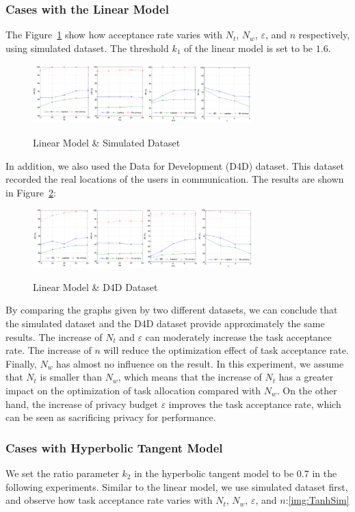 \subsubsection{Cases with the Linear Model}
The Figure~\ref{img:LinSim} show how acceptance rate varies with $N_t$, $N_w$, $\varepsilon$, and $n$ respectively, using simulated dataset. The threshold $k_1$ of the linear model is set to be $1.6$.

\begin{figure}
\includegraphics[width=8.5cm]{LinSim}
\label{img:LinSim}
\caption{Linear Model \& Simulated Dataset}
\end{figure}

In addition, we also used the Data for Development (D4D) dataset. This dataset recorded the real locations of the users in communication. The results are shown in Figure~\ref{img:LinD4D}:

\begin{figure}
\includegraphics[width=8.5cm]{LinD4D}
\label{img:LinD4D}
\caption{Linear Model \& D4D Dataset}
\end{figure}

By comparing the graphs given by two different datasets, we can conclude that the simulated dataset and the D4D dataset provide approximately the same results. The increase of $N_t$ and $\varepsilon$ can moderately increase the task acceptance rate. The increase of $n$ will reduce the optimization effect of task acceptance rate. Finally, $N_w$ has almost no influence on the result. In this experiment, we assume that $N_t$ is smaller than $N_w$, which means that the increase of $N_t$ has a greater impact on the optimization of task allocation compared with $N_w$. On the other hand, the increase of privacy budget $\varepsilon$ improves the task acceptance rate, which can be seen as sacrificing privacy for performance.

\subsubsection{Cases with Hyperbolic Tangent Model}
We set the ratio parameter $k_2$ in the hyperbolic tangent model to be $0.7$ in the following experiments. Similar to the linear model, we use simulated dataset first, and observe how task acceptance rate varies with $N_t$, $N_w$, $\varepsilon$, and $n$:\ref{img:TanhSim}

